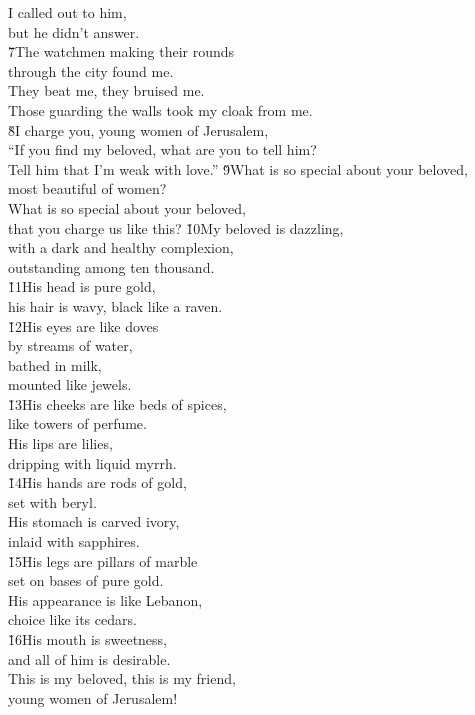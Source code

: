 \begin{poetry}
\poemll    I called out to him, \\
\poemlll       but he didn't answer. \\
\poeml \v{7}The watchmen making their rounds \\
\poemll    through the city found me. \\
\poeml They beat me, they bruised me. \\
\poemll    Those guarding the walls took my cloak from me. \\
\poeml \v{8}I charge you, young women of Jerusalem, \\
\poemll    ``If you find my beloved, what are you to tell him? \\
\poemlll       Tell him that I'm weak with love.''
\poeml \v{9}What is so special about your beloved, \\
\poemll    most beautiful of women? \\
\poeml What is so special about your beloved, \\
\poemll    that you charge us like this?
\poeml \v{10}My beloved is dazzling, \\
\poemll    with a dark and healthy complexion, \\
\poemlll       outstanding among ten thousand. \\
\poeml \v{11}His head is pure gold, \\
\poemll    his hair is wavy, black like a raven. \\
\poeml \v{12}His eyes are like doves \\
\poemll    by streams of water, \\
\poeml bathed in milk, \\
\poemll    mounted like jewels. \\
\poeml \v{13}His cheeks are like beds of spices, \\
\poemll    like towers of perfume. \\
\poeml His lips are lilies, \\
\poemll    dripping with liquid myrrh. \\
\poeml \v{14}His hands are rods of gold, \\
\poemll    set with beryl. \\
\poeml His stomach is carved ivory, \\
\poemll    inlaid with sapphires. \\
\poeml \v{15}His legs are pillars of marble \\
\poemll    set on bases of pure gold. \\
\poeml His appearance is like Lebanon, \\
\poemll    choice like its cedars. \\
\poeml \v{16}His mouth is sweetness, \\
\poemll    and all of him is desirable. \\
\poeml This is my beloved, this is my friend, \\
\poemll    young women of Jerusalem!
\end{poetry}
